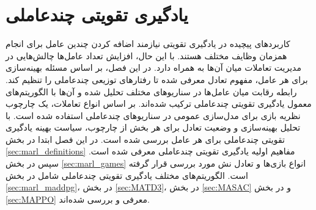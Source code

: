 \chapter{یادگیری تقویتی چندعاملی}
کاربردهای پیچیده در یادگیری تقویتی نیازمند اضافه کردن چندین عامل برای انجام همزمان وظایف مختلف هستند.
با این حال، افزایش تعداد عامل‌ها چالش‌هایی در مدیریت تعاملات میان آن‌ها به همراه دارد.
در این فصل، بر اساس مسئله بهینه‌سازی برای هر عامل، مفهوم تعادل معرفی شده تا رفتارهای توزیعی چندعاملی را تنظیم کند.
رابطه رقابت میان عامل‌ها در سناریوهای مختلف تحلیل شده و آن‌ها با الگوریتم‌های معمول یادگیری تقویتی چندعاملی ترکیب شده‌اند. بر اساس انواع تعاملات، یک چارچوب نظریه بازی برای مدل‌سازی عمومی در سناریوهای چندعاملی استفاده شده است. با تحلیل بهینه‌سازی و وضعیت تعادل برای هر بخش از چارچوب، سیاست بهینه یادگیری تقویتی چندعاملی برای هر عامل بررسی شده است. در این فصل ابتدا در بخش \ref{sec:marl_definitions} مفاهیم اولیه یادگیری تقویتی چندعاملی معرفی شده است.
 سپس در بخش \ref{sec:marl_games} انواع بازی‌ها و تعادل نش مورد بررسی قرار گرفته است.
الگوریتم‌های مختلف یادگیری تقویتی چندعاملی شامل
 در بخش
  \ref{sec:marl_maddpg}،
    در بخش \ref{sec:MATD3}،
     در بخش \ref{sec:MASAC} و  در بخش \ref{sec:MAPPO} معرفی و بررسی شده‌اند.
  
    
    
    
    
    
    
     
%    
%    
